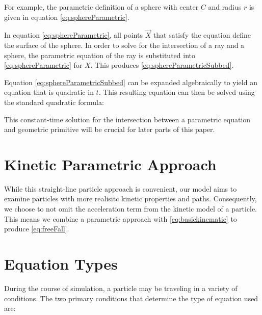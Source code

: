 For example, the parametric definition of a sphere with center $C$ and radius $r$ is given in equation \eqref{eq:sphereParametric}.

 {
	\label{eq:sphereParametric}
}

In equation \eqref{eq:sphereParametric}, all points $\vec{X}$ that satisfy the equation define the surface of the sphere. In order to solve for the intersection of a ray and a sphere, the parametric equation of the ray is substituted into \eqref{eq:sphereParametric} for $X$. This produces \eqref{eq:sphereParametricSubbed}.

 {
	\label{eq:sphereParametricSubbed}
}


Equation \eqref{eq:sphereParametricSubbed} can be expanded algebraically to yield an equation that is quadratic in $t$. This resulting equation can then be solved using the standard quadratic formula:

 {
	\label{eq:quadraticFormula} 
}

This constant-time solution for the intersection between a parametric equation and geometric primitive will be crucial for later parts of this paper.

\section{Kinetic Parametric Approach}

While this straight-line particle approach is convenient, our model aims to examine particles with more realisitc kinetic properties and paths. Consequently, we choose to not omit the acceleration term from the kinetic model of a particle. This means we combine a parametric approach with \eqref{eq:basickinematic} to produce \eqref{eq:freeFall}.


\section{Equation Types}

During the course of simulation, a particle may be traveling in a variety of conditions. The two primary conditions that determine the type of equation used are:

